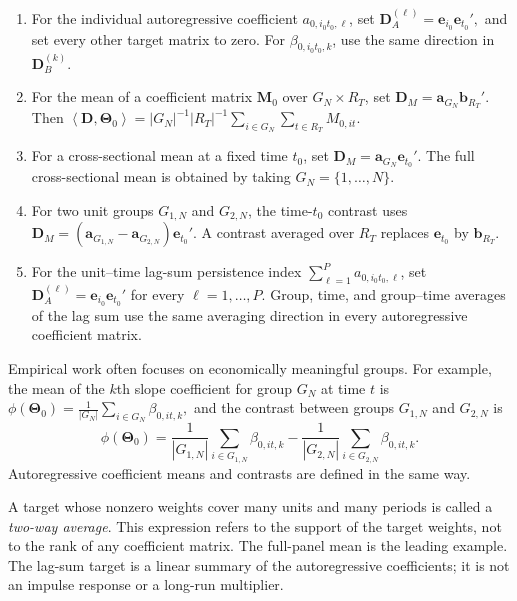 \documentclass[11pt]{article}
\numberwithin{equation}{section}
\theoremstyle{remark}
\newcommand{\ip}[2]{\left\langle #1,#2\right\rangle}
\newcommand{\be}{\bm e}
\newcommand{\bD}{\bm D}
\newcommand{\bM}{\bm M}
\newcommand{\bTheta}{\bm\Theta}
\begin{document}
\begin{enumerate}[label=(\roman*),leftmargin=2em]
\item For the individual autoregressive coefficient $a_{0,i_0t_0,\ell}$, set
$
\bD_A^{(\ell)}=\be_{i_0}\be_{t_0}',
$
and set every other target matrix to zero. For $\beta_{0,i_0t_0,k}$, use the same direction in $\bD_B^{(k)}$.

\item For the mean of a coefficient matrix $\bM_0$ over $G_N\times R_T$, set
$
\bD_M=\bm a_{G_N}\bm b_{R_T}'.
$
Then $\ip{\bD}{\bTheta_0}=|G_N|^{-1}|R_T|^{-1}\sum_{i\in G_N}\sum_{t\in R_T}M_{0,it}$.

\item For a cross-sectional mean at a fixed time $t_0$, set
$
\bD_M=\bm a_{G_N}\be_{t_0}'.
$
The full cross-sectional mean is obtained by taking $G_N=\{1,\ldots,N\}$.

\item For two unit groups $G_{1,N}$ and $G_{2,N}$, the time-$t_0$ contrast uses
$
\bD_M
=
(\bm a_{G_{1,N}}-\bm a_{G_{2,N}})\be_{t_0}'.
$
A contrast averaged over $R_T$ replaces $\be_{t_0}$ by $\bm b_{R_T}$.

\item For the unit--time lag-sum persistence index $\sum_{\ell=1}^{P}a_{0,i_0t_0,\ell}$, set
$
\bD_A^{(\ell)}=\be_{i_0}\be_{t_0}'
$
 for every $\ell=1,\ldots,P.
$
Group, time, and group--time averages of the lag sum use the same averaging direction in every autoregressive coefficient matrix.
\end{enumerate}

Empirical work often focuses on economically meaningful groups. For example, the mean of the $k$th slope coefficient for group $G_N$ at time $t$ is
$
\phi(\bTheta_0)
=
\frac{1}{|G_N|}
\sum_{i\in G_N}\beta_{0,it,k},
$
and the contrast between groups $G_{1,N}$ and $G_{2,N}$ is
$$
\phi(\bTheta_0)
=
\frac{1}{|G_{1,N}|}\sum_{i\in G_{1,N}}\beta_{0,it,k}
-
\frac{1}{|G_{2,N}|}\sum_{i\in G_{2,N}}\beta_{0,it,k}.
$$
Autoregressive coefficient means and contrasts are defined in the same way.

A target whose nonzero weights cover many units and many periods is called a \emph{two-way average}. This expression refers to the support of the target weights, not to the rank of any coefficient matrix. The full-panel mean is the leading example. The lag-sum target is a linear summary of the autoregressive coefficients; it is not an impulse response or a long-run multiplier.


\end{document}
